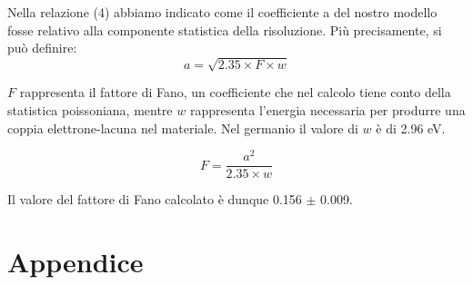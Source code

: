 \documentclass[a4paper,10pt]{article}
\begin{document}
Nella relazione (4) abbiamo indicato come il coefficiente a del nostro modello fosse relativo alla componente statistica della risoluzione. Pi\`u precisamente, si può definire:
$$
	a=\sqrt{2.35 \times F \times w}
$$

\noindent $F$ rappresenta il fattore di Fano, un coefficiente che nel calcolo tiene conto della statistica poissoniana, mentre $w$ rappresenta l'energia necessaria per produrre una coppia elettrone-lacuna nel materiale. Nel germanio il valore di $w$ \`e di 2.96 eV.

$$
	F=\frac{a^2}{2.35 \times w}
$$

\noindent Il valore del fattore di Fano calcolato \`e dunque 0.156 $\pm$ 0.009.


\section{Appendice}
\end{document}
